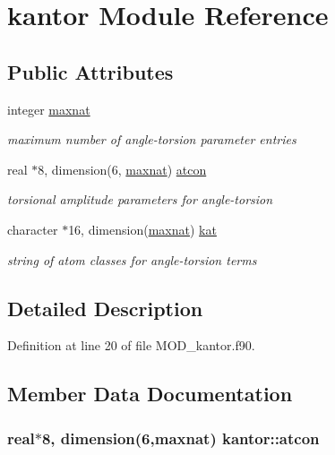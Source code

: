 \hypertarget{classkantor}{\section{kantor Module Reference}
\label{classkantor}
}
\subsection*{Public Attributes}
\begin{DoxyCompactItemize}
\item 
integer \hyperlink{classkantor_a5d160591c7d1090e20d64ac57db387a6}{maxnat}
\begin{DoxyCompactList}\small\item\em maximum number of angle-\/torsion parameter entries \end{DoxyCompactList}\item 
real $\ast$8, dimension(6, \hyperlink{classkantor_a5d160591c7d1090e20d64ac57db387a6}{maxnat}) \hyperlink{classkantor_ad253cc7b9625573c3cfc42f8efe83904}{atcon}
\begin{DoxyCompactList}\small\item\em torsional amplitude parameters for angle-\/torsion \end{DoxyCompactList}\item 
character $\ast$16, dimension(\hyperlink{classkantor_a5d160591c7d1090e20d64ac57db387a6}{maxnat}) \hyperlink{classkantor_a0eae8ae2f7e4971be2bbc7522d9e7480}{kat}
\begin{DoxyCompactList}\small\item\em string of atom classes for angle-\/torsion terms \end{DoxyCompactList}\end{DoxyCompactItemize}


\subsection{Detailed Description}


Definition at line 20 of file M\-O\-D\-\_\-kantor.\-f90.



\subsection{Member Data Documentation}
\hypertarget{classkantor_ad253cc7b9625573c3cfc42f8efe83904}{
\subsubsection[{atcon}]{\setlength{\rightskip}{0pt plus 5cm}real$\ast$8, dimension(6,{\bf maxnat}) kantor\-::atcon}}\label{classkantor_ad253cc7b9625573c3cfc42f8efe83904}


